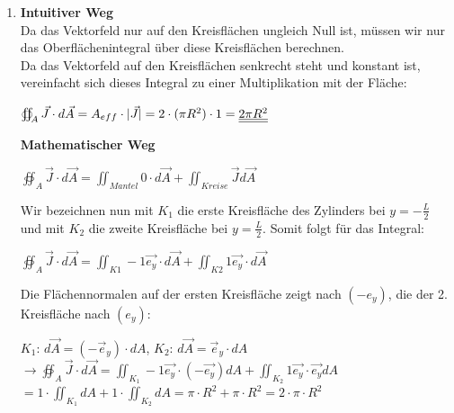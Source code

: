\begin{enumerate}
\begin{center}
			\end{center}
	\item \textbf{Intuitiver Weg} \\
	Da das Vektorfeld nur auf den Kreisflächen ungleich Null ist, müssen wir nur das Oberflächenintegral über diese Kreisflächen berechnen. \\
	Da das Vektorfeld auf den Kreisflächen senkrecht steht und konstant ist, vereinfacht sich dieses Integral zu einer Multiplikation mit der Fläche: \\
	\begin{center}
			$\oiint_A \vec{J} \cdot d\vec{A} = A_{eff} \cdot |\vec{J}| = 2 \cdot (\pi R^2) \cdot 1 =  \underline{\underline{2\pi R^2}}$
	\end{center}



	\textbf{Mathematischer Weg} \\ \begin{center}
		$\oiint_A \vec{J} \cdot d\vec{A} = \iint_{Mantel} 0 \cdot d\vec{A} + \iint_{Kreise} \vec{J} d\vec{A}$ \\
	\end{center}

		Wir bezeichnen nun mit $K_1$ die erste Kreisfläche des Zylinders bei $y = - \frac{L}{2}$ und mit $K_2$ die zweite Kreisfläche bei $y = \frac{L}{2}$. Somit folgt für das Integral:
		\begin{center}
		$\oiint_A \vec{J} \cdot d\vec{A} =  \iint_{K1} -1 \vec{e_y} \cdot  d\vec{A} + \iint_{K2} 1 \vec{e_y} \cdot d\vec{A}$
	\end{center}
	Die Flächennormalen auf der ersten Kreisfläche zeigt nach $(-e_y)$, die der 2. Kreisfläche nach $(e_y)$:
	\begin{center}
		$K_1$: $ d\vec{A} = (-\vec{e}_y) \cdot dA$, $K_2$: $ d\vec{A} = \vec{e}_y \cdot dA$ \\
		$ \rightarrow  \oiint_A \vec{J} \cdot d\vec{A} =  \iint_{K_1} -1 \vec{e_y} \cdot (- \vec{e_y})  dA + \iint_{K_2} 1 \vec{e_y} \cdot \vec{e_y} dA $ \\
		$ = 1\cdot \iint_{K_1} dA + 1\cdot \iint_{K_2} dA = \pi\cdot R^2 + \pi\cdot R^2 = 2 \cdot \pi\cdot R^2$

	\end{center}

\end{enumerate}

\iend
